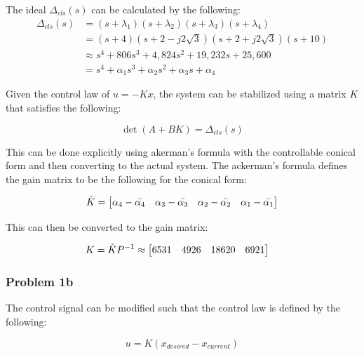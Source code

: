\documentclass[]{article}
\begin{document}
			The ideal $\Delta_{cls} (s)$ can be calculated by the following:
			\begin{equation}
				\begin{aligned}
					\Delta_{cls} (s) &= (s + \lambda_1) (s + \lambda_2) (s + \lambda_3)(s+\lambda_4)\\
									&= (s + 4) (s + 2 -j 2 \sqrt{3}) (s+2 + j 2 \sqrt{3})(s+10)\\
									&\approx s^4 + 806 s^3 + 4,824 s^2 + 19,232 s + 25,600\\
									&= s^4 + \alpha_1 s^3 + \alpha_2 s^2 + \alpha_3 s + \alpha_4
				\end{aligned} \label{eq:ideal_char_poly}
			\end{equation}
			
			Given the control law of $u = - K x$, the system can be stabilized using a matrix $K$ that satisfies the following:
			
			\begin{equation}
				\det(A + B K) = \Delta_{cls} (s)
			\end{equation}
			
			This can be done explicitly using akerman's formula with the controllable conical form and then converting to the actual system. The ackerman's formula defines the gain matrix to be the following for the conical form:

			\begin{equation}
				\hat{K} = \mqty[\alpha_4 - \bar{\alpha_4} & \alpha_3 - \bar{\alpha_3} & \alpha_2 - \bar{\alpha_2} & \alpha_1 - \bar{\alpha_1}]
			\end{equation}
			
			This can then be converted to the gain matrix:
			
			\begin{equation}
				\begin{aligned}
					K &= \hat{K} P^{-1} \approx \mqty[6531 &4926 &18620 &6921] 
				\end{aligned}
			\end{equation}
			
			
		\subsubsection{Problem 1b}
			The control signal can be modified such that the control law is defined by the following:
			
			\begin{equation}
				u = K (x_{desired} - x_{current})
			\end{equation}
			
\end{document}
